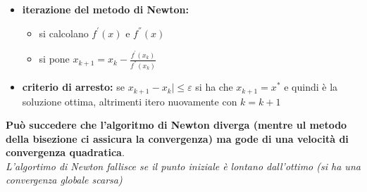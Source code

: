 \message{ !name(ro.tex)}\documentclass[a4paper,12pt, oneside]{book}
\begin{document}
\begin{enumerate}
\begin{itemize}
    \item \textbf{iterazione del metodo di Newton:}
    \begin{itemize}
      \item si calcolano $f^{'}(x)$ e $f^{''}(x)$
      \item si pone $x_{k+1}=x_k-\frac{f^{'}(x_k)}{f^{''}(x_k)}$
    \end{itemize}
    \item \textbf{criterio di arresto:} se $x_{k+1}-x_k|\leq
    \varepsilon$ si ha che $x_{k+1}=x^*$ e quindi è la soluzione
    ottima, altrimenti itero nuovamente con $k=k+1$
  \end{itemize}
  \textbf{Può succedere che l'algoritmo di Newton diverga (mentre ul
    metodo della bisezione ci assicura la convergenza) ma gode di
    una velocità di convergenza quadratica}.\\
  \textit{L'algortimo di Newton fallisce se il punto iniziale è
    lontano dall'ottimo (si ha una convergenza globale scarsa)}
\end{enumerate}
\end{document}

